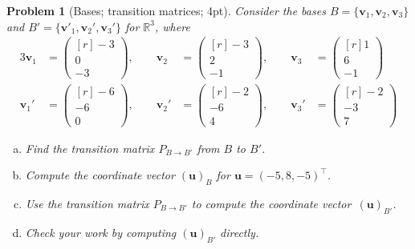 \documentclass[12pt,a4]{article}
\newtheorem{problem}{Problem}
\newcommand{\bR}{{\mathbb R}}
\newcommand{\bu}{{\mathbf u}}
\newcommand{\bv}{{\mathbf v}}
\begin{document}
\begin{problem}[Bases; transition matrices; 4pt]\rm
	Consider the bases $B = \{\bv_1,\bv_2,\bv_3\}$ and $B' = \{\bv'_1,\bv_2',\bv_3'\}$ for $\bR^3$, where
	\begin{alignat*}{3}
	\bv_1 &= \begin{pmatrix}[r] -3 \\ 0 \\ -3  \end{pmatrix},
	\qquad
	\bv_2 &= \begin{pmatrix}[r] -3 \\ 2 \\ -1  \end{pmatrix},
	\qquad
	\bv_3 &= \begin{pmatrix}[r] 1 \\ 6 \\ -1  \end{pmatrix}
	\\
	\bv_1' &= \begin{pmatrix}[r] -6 \\ -6 \\ 0  \end{pmatrix},
	\qquad
	\bv_2' &= \begin{pmatrix}[r] -2 \\ -6 \\ 4  \end{pmatrix},
	\qquad
	\bv_3' &= \begin{pmatrix}[r] -2 \\ -3 \\ 7  \end{pmatrix}
	\end{alignat*}
	\begin{enumerate}[(a)]
		\item Find the transition matrix $P_{B \to B'}$ from $B$ to $B'$.
		\item Compute the coordinate vector $(\bu)_B$ for $\bu = (-5,8,-5)^\top$.
		\item Use the transition matrix $P_{B \to B'}$ to compute the coordinate vector~$(\bu)_{B'}$.
		\item Check your work by computing $(\bu)_{B'}$ directly.
	\end{enumerate}
\end{problem}
\end{document}
